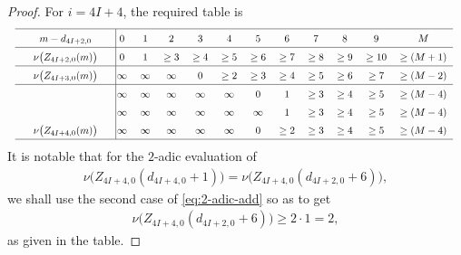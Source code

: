 \documentclass[12pt,reqno]{amsart}
\numberwithin{equation}{section}
\theoremstyle{theorem}
\theoremstyle{definition}
\begin{document}
\begin{proof}
	For $i=4I+4$, the required table is
	\begin{align*}
		\renewcommand\arraystretch{1.5}
		\scalebox{0.8}{%
			\begin{tabular*}{1.25\textwidth}{p{0pt}cp{0pt}|@{\extracolsep{\fill}}ccccccccccc}
				\hline
				& $m-d_{4I+2,0}$ && $0$ & $1$ & $2$ & $3$ & $4$ & $5$ & $6$ & $7$ & $8$ & $9$ & $M$\\
				\hline
				& $\nu\big(Z_{4I+2,0}(m)\big)$ && $0$ & $1$ & $\ge 3$ & $\ge 4$ & $\ge 5$ & $\ge 6$ & $\ge 7$ & $\ge 8$ & $\ge 9$ & $\ge 10$ & $\ge (M+1)$\\
				\hline
				& $\nu\big(Z_{4I+3,0}(m)\big)$ && $\infty$ & $\infty$ & $\infty$ & $0$ & $\ge 2$ & $\ge 3$ & $\ge 4$ & $\ge 5$ & $\ge 6$ & $\ge 7$ & $\ge (M-2)$\\
				\hline
				&  && $\infty$ & $\infty$ & $\infty$ & $\infty$ & $\infty$ & $0$ & $1$ & $\ge 3$ & $\ge 4$ & $\ge 5$ & $\ge (M-4)$\\
				&  && $\infty$ & $\infty$ & $\infty$ & $\infty$ & $\infty$ & $\infty$ & $1$ & $\ge 3$ & $\ge 4$ & $\ge 5$ & $\ge (M-4)$\\
				& $\nu\big(Z_{4I+4,0}(m)\big)$ && $\infty$ & $\infty$ & $\infty$ & $\infty$ & $\infty$ & $0$ & $\ge 2$ & $\ge 3$ & $\ge 4$ & $\ge 5$ & $\ge (M-4)$\\
				\hline
			\end{tabular*}
		}
	\end{align*}
	It is notable that for the $2$-adic evaluation of
	\begin{align*}
		\nu\big(Z_{4I+4,0}(d_{4I+4,0}+1)\big) = \nu\big(Z_{4I+4,0}(d_{4I+2,0}+6)\big),
	\end{align*}
	we shall use the second case of \eqref{eq:2-adic-add} so as to get
	\begin{align*}
		\nu\big(Z_{4I+4,0}(d_{4I+2,0}+6)\big)\ge 2\cdot 1 = 2,
	\end{align*}
	as given in the table.
	

\end{proof}
\end{document}
